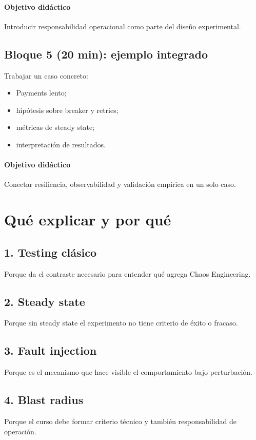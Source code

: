 \documentclass[variant=docente,cover=institutional,mode=screen]{ua-engineering-v6-article}
\begin{document}
\paragraph{Objetivo didáctico}
Introducir responsabilidad operacional como parte del diseño experimental.

\subsection*{Bloque 5 (20 min): ejemplo integrado}
Trabajar un caso concreto:
\begin{itemize}
\item Payments lento;
\item hipótesis sobre breaker y retries;
\item métricas de steady state;
\item interpretación de resultados.
\end{itemize}

\paragraph{Objetivo didáctico}
Conectar resiliencia, observabilidad y validación empírica en un solo caso.

\section{Qué explicar y por qué}

\subsection*{1. Testing clásico}
Porque da el contraste necesario para entender qué agrega Chaos Engineering.

\subsection*{2. Steady state}
Porque sin steady state el experimento no tiene criterio de éxito o fracaso.

\subsection*{3. Fault injection}
Porque es el mecanismo que hace visible el comportamiento bajo perturbación.

\subsection*{4. Blast radius}
Porque el curso debe formar criterio técnico y también responsabilidad de operación.
\end{document}
